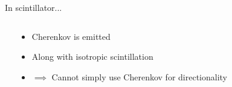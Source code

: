 \documentclass[14pt]{beamer}
\begin{document}
\begin{frame}{In scintillator...}
\begin{columns}[T]
\begin{block}{}
		\end{block}
		\begin{block}{}
			\begin{itemize}
				\item<3-> Cherenkov is emitted
				\item<4-> Along with isotropic scintillation
				\item<5-> {\color{red}$\implies$ Cannot simply use Cherenkov
					for directionality}
			\end{itemize}
		\end{block}
	\end{columns}
\end{frame}
\end{document}
